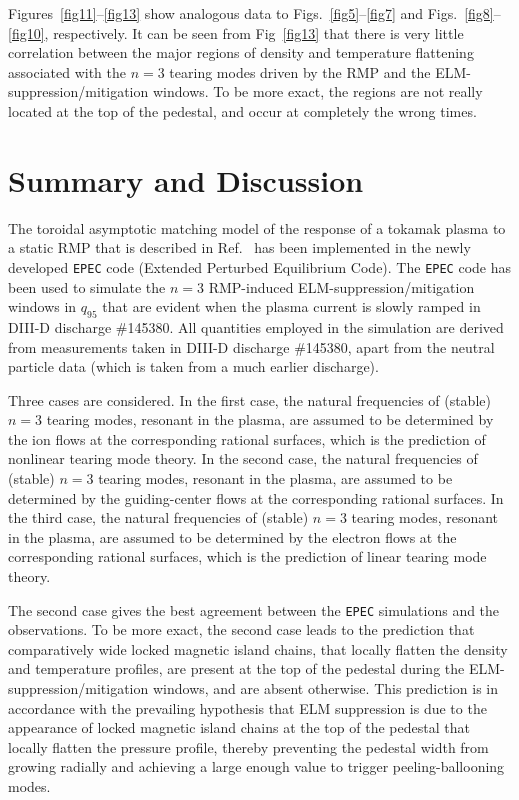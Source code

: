 \documentclass[12pt,prb,aps]{revtex4-1}
\begin{document}
Figures~\ref{fig11}--\ref{fig13} show analogous data to Figs.~\ref{fig5}--\ref{fig7} and Figs.~\ref{fig8}--\ref{fig10}, respectively.  
It can be seen from Fig~\ref{fig13} that there is very little correlation between the major regions of density and temperature flattening associated
with the $n=3$ tearing modes driven by the RMP and the  ELM-suppression/mitigation windows. To be more exact, the 
regions  are not really located at the top of the pedestal, and occur at completely the wrong times.  

\section{Summary and Discussion}
The toroidal asymptotic matching model of the response of a tokamak plasma to a static RMP that is described in Ref.~
has been implemented in the newly developed {\tt EPEC} code (Extended Perturbed Equilibrium Code). The {\tt EPEC} code has  been used to simulate the $n=3$ RMP-induced ELM-suppression/mitigation
windows in $q_{95}$ that are evident when the plasma current is slowly ramped in DIII-D discharge \#145380. All quantities employed in the simulation are
derived from measurements taken in DIII-D discharge \#145380, apart from the neutral particle data (which is taken from a much earlier discharge).

Three cases are considered. In the first case, the natural frequencies of (stable) $n=3$ tearing modes, resonant in the plasma, are assumed to be
determined by the ion flows at the corresponding rational surfaces, which is the prediction of nonlinear tearing mode theory.\cite{nl1,nl2,nl3}
In the second case, the natural frequencies of (stable) $n=3$ tearing modes, resonant in the plasma, are assumed to be
determined by the guiding-center flows at the corresponding rational surfaces.\cite{heyn,paz1} 
In the third case, the natural frequencies of (stable) $n=3$ tearing modes, resonant in the plasma, are assumed to be
determined by the electron flows at the corresponding rational surfaces, which is the prediction of linear tearing mode theory.\cite{lin1,lin2,lin3}

The second case gives the best agreement between the {\tt EPEC} simulations and the  observations. To be more
exact, the second case leads to the prediction that comparatively wide locked magnetic island chains, that locally flatten the density and temperature profiles, 
 are present at the top of the pedestal during the ELM-suppression/mitigation 
windows, and are absent otherwise. This prediction is in accordance with the prevailing hypothesis that ELM suppression is due to the appearance of locked
magnetic island chains at the top of the pedestal that locally flatten the pressure profile, thereby preventing the pedestal width from growing radially and achieving a  
large enough value to trigger peeling-ballooning modes.\cite{d3d}
\end{document}
